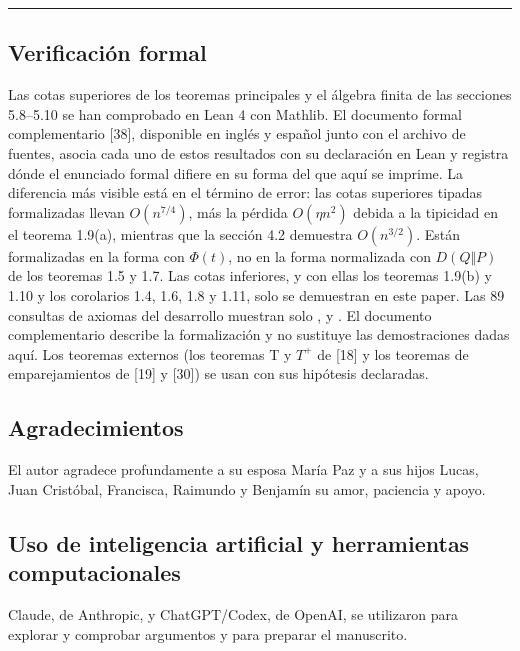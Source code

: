 \documentclass[spanish,11pt,a4paper]{article}
\begin{document}
\begin{center}\rule{0.5\linewidth}{0.5pt}\end{center}

\subsection{Verificación formal}\label{verificaciuxf3n-formal}

Las cotas superiores de los teoremas principales y el álgebra finita de las secciones 5.8--5.10 se han comprobado en Lean 4 con Mathlib. El documento formal complementario {[}38{]}, disponible en inglés y español junto con el archivo de fuentes, asocia cada uno de estos resultados con su declaración en Lean y registra dónde el enunciado formal difiere en su forma del que aquí se imprime. La diferencia más visible está en el término de error: las cotas superiores tipadas formalizadas llevan \(O(n^{7/4})\), más la pérdida \(O(\eta n^2)\) debida a la tipicidad en el teorema 1.9(a), mientras que la sección 4.2 demuestra \(O(n^{3/2})\). Están formalizadas en la forma con \(\Phi(t)\), no en la forma normalizada con \(D(Q\Vert P)\) de los teoremas 1.5 y 1.7. Las cotas inferiores, y con ellas los teoremas 1.9(b) y 1.10 y los corolarios 1.4, 1.6, 1.8 y 1.11, solo se demuestran en este paper. Las 89 consultas de axiomas del desarrollo muestran solo \mbox{}, \mbox{} y \mbox{}. El documento complementario describe la formalización y no sustituye las demostraciones dadas aquí. Los teoremas externos (los teoremas T y \(T^+\) de {[}18{]} y los teoremas de emparejamientos de {[}19{]} y {[}30{]}) se usan con sus hipótesis declaradas.

\subsection{Agradecimientos}\label{agradecimientos}

El autor agradece profundamente a su esposa María Paz y a sus hijos Lucas, Juan Cristóbal, Francisca, Raimundo y Benjamín su amor, paciencia y apoyo.

\subsection{Uso de inteligencia artificial y herramientas computacionales}\label{uso-de-inteligencia-artificial-y-herramientas-computacionales}

Claude, de Anthropic, y ChatGPT/Codex, de OpenAI, se utilizaron para explorar y comprobar argumentos y para preparar el manuscrito.
\end{document}
